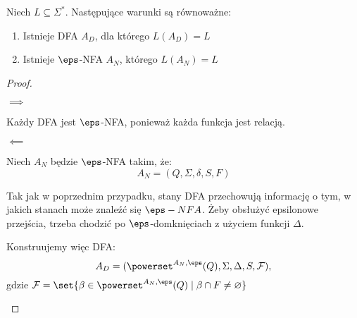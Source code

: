 \begin{theorem}
    Niech \( L \subseteq \Sigma^* \).
    Następujące warunki są równoważne:
    \begin{enumerate}
            \item Istnieje DFA \( A_D \), dla którego \( L(A_D) = L \)
        \item Istnieje \(\eps\)-NFA \( A_N \), którego \( L(A_N) = L \) 
    \end{enumerate}
\end{theorem}
\begin{proof}
     \begin{description}
        \item \( \implies \)
        
        Każdy DFA jest \(\eps\)-NFA, ponieważ każda funkcja jest relacją.
            
        \item \( \impliedby \)
        
        Niech \(A_N\) będzie \(\eps\)-NFA takim, że: 
        \[ A_N = (Q, \Sigma, \delta, S, F) \]
        
        Tak jak w poprzednim przypadku, stany DFA przechowują informację o tym, w jakich stanach może znaleźć się \(\eps-NFA\).
        Żeby obsłużyć epsilonowe przejścia, trzeba chodzić po \(\eps\)-domknięciach z użyciem funkcji \( \Delta \). 
        
        Konstruujemy więc DFA:
        \[ A_D = (\powerset^{A_N, \eps}(Q), \Sigma, \Delta, S, \mathcal{F}), \]
        gdzie \( \mathcal{F} = \set{\beta \in \powerset^{A_N, \eps}(Q) \mid \beta \cap F \neq \varnothing} \)
    \end{description}
\end{proof}